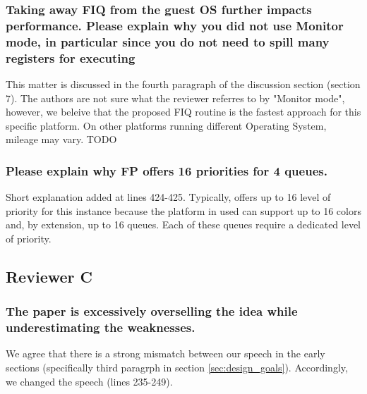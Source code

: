         \subsubsection{Taking away FIQ from the guest OS further impacts performance. Please explain why you did not use Monitor mode, in particular since you do not need to spill many registers for executing}
            This matter is discussed in the fourth paragraph of the discussion section (section 7).
            The authors are not sure what the reviewer referres to by "Monitor mode", however, we beleive that the proposed FIQ routine is the fastest approach for this specific platform. On other platforms running different Operating System, mileage may vary.
            TODO

        \subsubsection{Please explain why FP offers 16 priorities for 4 queues.}
            Short explanation added at lines 424-425. Typically, \schim offers up to 16 level of priority for this instance because the platform in used can support up to 16 colors and, by extension, up to 16 queues. Each of these queues require a dedicated level of priority.

    \subsection{Reviewer C}
        \subsubsection{The paper is excessively overselling the idea while underestimating the weaknesses.}
            We agree that there is a strong mismatch between our speech in the early sections (specifically third paragrph in section \ref{sec:design_goals}).
            Accordingly, we changed the speech (lines 235-249).

